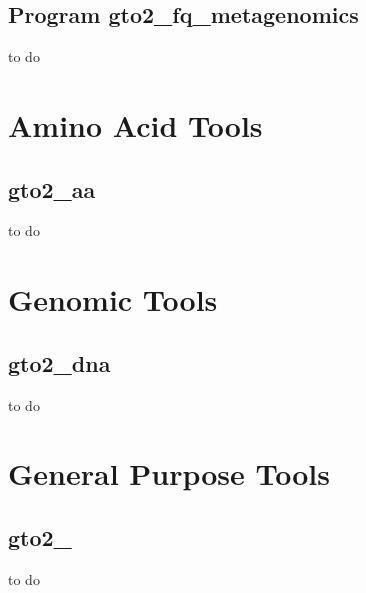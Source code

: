 \documentclass[11pt,]{krantz}
\begin{document}
\section{Program
gto2\_fq\_metagenomics}\label{program-gto2_fq_metagenomics}

to do

\chapter{Amino Acid Tools}\label{amino-acid-tools}

\section{gto2\_aa}\label{gto2_aa}

to do

\chapter{Genomic Tools}\label{genomic-tools}

\section{gto2\_dna}\label{gto2_dna}

to do

\chapter{General Purpose Tools}\label{general-purpose-tools}

\section{gto2\_}\label{gto2_}

to do



\printindex
\end{document}
